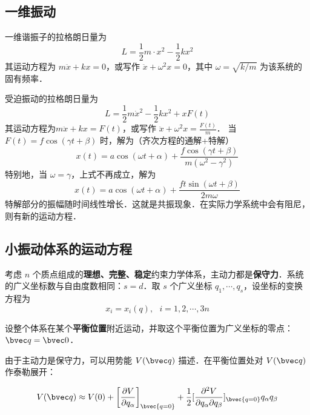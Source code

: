 

\subsection{一维振动}
一维谐振子的拉格朗日量为
\begin{equation}
L=\frac{1}{2}m\cdot{x}^2-\frac{1}{2}kx^2
\end{equation}
其运动方程为 $m\ddot {x}+kx=0$，或写作 $\ddot{x}+\omega^2 x=0$，其中 $\omega=\sqrt{k/m}$ 为该系统的固有频率．

受迫振动的拉格朗日量为 
\begin{equation}
L=\frac{1}{2}m\dot{x}^2-\frac{1}{2}kx^2+xF(t)
\end{equation}
其运动方程为$m\ddot{x}+kx=F(t)$，或写作 $\ddot{x}+\omega^2 x=\frac{F(t)}{m}$．
当 $F(t)=f\cos(\gamma t+\beta)$ 时，解为（齐次方程的通解+特解）
\begin{equation}
x(t)=a\cos(\omega t+\alpha)+\frac{f\cos(\gamma t+\beta)}{m(\omega^2-\gamma^2)}
\end{equation}
特别地，当 $\omega=\gamma$，上式不再成立，解为
\begin{equation}
x(t)=a \cos(\omega t+\alpha)+\frac{ft \sin(\omega t+\beta)}{2m\omega}
\end{equation}
特解部分的振幅随时间线性增长．这就是共振现象．在实际力学系统中会有阻尼，则有新的运动方程．

\subsection{小振动体系的运动方程}
考虑 $n$ 个质点组成的\textbf{理想、完整、稳定}约束力学体系，主动力都是\textbf{保守力}．系统的广义坐标数与自由度数相同：$s=d$．取 $s$ 个广义坐标 $q_1,\cdots,q_s$，设坐标的变换方程为
\begin{equation}
x_i = x_i(q),\ \ \  i=1,2,\cdots,3n
\end{equation}

设整个体系在某个\textbf{平衡位置}附近运动，并取这个平衡位置为广义坐标的零点：$\bvec q=\bvec 0$．

由于主动力是保守力，可以用势能 $V(\bvec q)$ 描述．在平衡位置处对 $V(\bvec q)$ 作泰勒展开：

\begin{equation}
V(\bvec q)\approx V(0)+\left[\frac{\partial V}{\partial q_\alpha}\right]_\bvec {q=0} +\frac{1}{2}[\frac{\partial^2V}{\partial q_\alpha\partial q_\beta}]_\bvec{q=0}q_\alpha q_\beta
\end{equation}